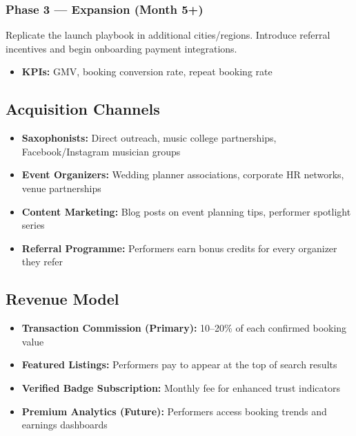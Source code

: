 \documentclass[11pt,a4paper]{article}
\begin{document}
\subsubsection{Phase 3 --- Expansion (Month 5+)}
Replicate the launch playbook in additional cities/regions. Introduce referral
incentives and begin onboarding payment integrations.
\begin{itemize}[leftmargin=1.5em]
  \item \textbf{KPIs:} GMV, booking conversion rate, repeat booking rate
\end{itemize}

\subsection{Acquisition Channels}
\begin{itemize}[leftmargin=1.5em]
  \item \textbf{Saxophonists:} Direct outreach, music college partnerships,
        Facebook/Instagram musician groups
  \item \textbf{Event Organizers:} Wedding planner associations, corporate HR
        networks, venue partnerships
  \item \textbf{Content Marketing:} Blog posts on event planning tips, performer
        spotlight series
  \item \textbf{Referral Programme:} Performers earn bonus credits for every
        organizer they refer
\end{itemize}

\subsection{Revenue Model}
\begin{itemize}[leftmargin=1.5em]
  \item \textbf{Transaction Commission (Primary):} 10--20\% of each confirmed
        booking value
  \item \textbf{Featured Listings:} Performers pay to appear at the top of
        search results
  \item \textbf{Verified Badge Subscription:} Monthly fee for enhanced trust
        indicators
  \item \textbf{Premium Analytics (Future):} Performers access booking trends
        and earnings dashboards
\end{itemize}

\end{document}
